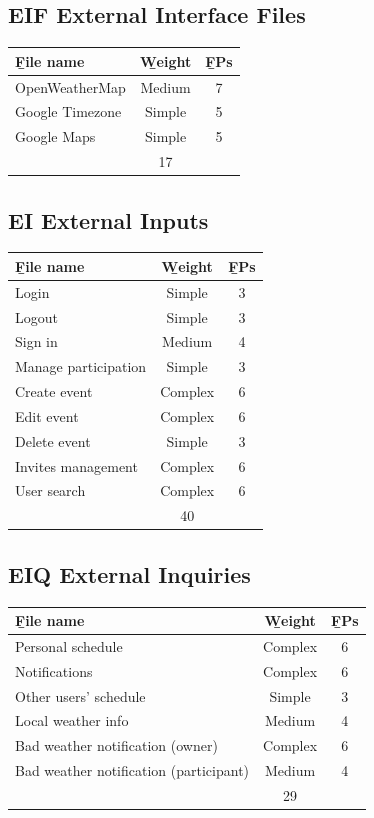 \subsection{EIF External Interface Files}
\begin{tabularx}{\linewidth}{|X|c|c|}
  \hline \b{File name} & \b{Weight} & \b{FPs}\\
  \hline OpenWeatherMap & Medium & 7 \\
  \hline Google Timezone & Simple & 5 \\
  \hline Google Maps & Simple & 5 \\
  \Xhline{4\arrayrulewidth} \multicolumn{2}{|l|}{Total}  & 17 \\
  \hline
\end{tabularx}
\subsection{EI External Inputs}
\begin{tabularx}{\linewidth}{|X|c|c|}
  \hline \b{File name} & \b{Weight} & \b{FPs}\\
  \hline Login & Simple & 3 \\
  \hline Logout & Simple & 3 \\
  \hline Sign in & Medium & 4 \\
  \hline Manage participation & Simple & 3 \\
  \hline Create event & Complex & 6 \\
  \hline Edit event & Complex & 6 \\
  \hline Delete event & Simple & 3 \\
  \hline Invites management & Complex & 6 \\
  \hline User search & Complex & 6 \\
  \Xhline{4\arrayrulewidth} \multicolumn{2}{|l|}{Total}  & 40 \\
  \hline
\end{tabularx}
\subsection{EIQ External Inquiries}
\begin{tabularx}{\linewidth}{|X|c|c|}
  \hline \b{File name} & \b{Weight} & \b{FPs}\\
  \hline Personal schedule & Complex & 6 \\
  \hline Notifications & Complex & 6 \\
  \hline Other users' schedule & Simple & 3 \\
  \hline Local weather info & Medium & 4 \\
  \hline Bad weather notification (owner) & Complex & 6 \\
  \hline Bad weather notification (participant) & Medium & 4 \\
  \Xhline{4\arrayrulewidth} \multicolumn{2}{|l|}{Total}  & 29 \\
  \hline
\end{tabularx}
